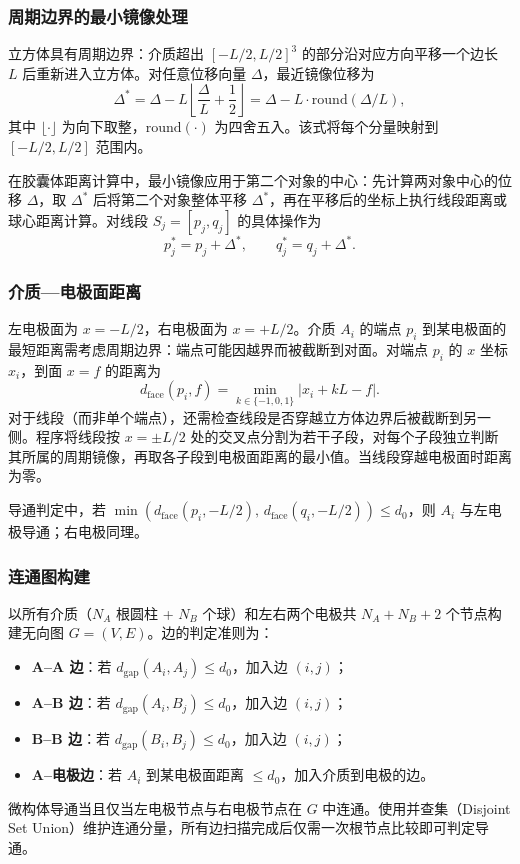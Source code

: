 \documentclass[12pt,a4paper,fontset=windows]{ctexart}
\begin{document}
\subsubsection{周期边界的最小镜像处理}
立方体具有周期边界：介质超出 $[-L/2,L/2]^3$ 的部分沿对应方向平移一个边长 $L$ 后重新进入立方体。对任意位移向量 $\Delta$，最近镜像位移为
\begin{equation}
\Delta^*=\Delta - L\left\lfloor\frac{\Delta}{L}+\frac{1}{2}\right\rfloor = \Delta - L\cdot\mathrm{round}(\Delta/L),
\label{eq:minimage}
\end{equation}
其中 $\lfloor\cdot\rfloor$ 为向下取整，$\mathrm{round}(\cdot)$ 为四舍五入。该式将每个分量映射到 $[-L/2,L/2]$ 范围内。

在胶囊体距离计算中，最小镜像应用于第二个对象的中心：先计算两对象中心的位移 $\Delta$，取 $\Delta^*$ 后将第二个对象整体平移 $\Delta^*$，再在平移后的坐标上执行线段距离或球心距离计算。对线段 $S_j=[p_j,q_j]$ 的具体操作为
\begin{equation}
p_j^*=p_j+\Delta^*,\qquad q_j^*=q_j+\Delta^*.
\label{eq:segshift}
\end{equation}

\subsubsection{介质—电极面距离}
左电极面为 $x=-L/2$，右电极面为 $x=+L/2$。介质 $A_i$ 的端点 $p_i$ 到某电极面的最短距离需考虑周期边界：端点可能因越界而被截断到对面。对端点 $p_i$ 的 $x$ 坐标 $x_i$，到面 $x=f$ 的距离为
\begin{equation}
d_{\mathrm{face}}(p_i,f)=\min_{k\in\{-1,0,1\}}|x_i+kL-f|.
\label{eq:face_dist}
\end{equation}
对于线段（而非单个端点），还需检查线段是否穿越立方体边界后被截断到另一侧。程序将线段按 $x=\pm L/2$ 处的交叉点分割为若干子段，对每个子段独立判断其所属的周期镜像，再取各子段到电极面距离的最小值。当线段穿越电极面时距离为零。

导通判定中，若 $\min(d_{\mathrm{face}}(p_i,-L/2),\,d_{\mathrm{face}}(q_i,-L/2))\le d_0$，则 $A_i$ 与左电极导通；右电极同理。

\subsubsection{连通图构建}
以所有介质（$N_A$ 根圆柱 + $N_B$ 个球）和左右两个电极共 $N_A+N_B+2$ 个节点构建无向图 $G=(V,E)$。边的判定准则为：
\begin{itemize}
\item \textbf{A--A 边}：若 $d_{\mathrm{gap}}(A_i,A_j)\le d_0$，加入边 $(i,j)$；
\item \textbf{A--B 边}：若 $d_{\mathrm{gap}}(A_i,B_j)\le d_0$，加入边 $(i,j)$；
\item \textbf{B--B 边}：若 $d_{\mathrm{gap}}(B_i,B_j)\le d_0$，加入边 $(i,j)$；
\item \textbf{A--电极边}：若 $A_i$ 到某电极面距离 $\le d_0$，加入介质到电极的边。
\end{itemize}
微构体导通当且仅当左电极节点与右电极节点在 $G$ 中连通。使用并查集（Disjoint Set Union）维护连通分量，所有边扫描完成后仅需一次根节点比较即可判定导通。
\end{document}
